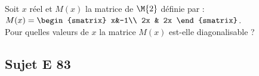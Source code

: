 \documentclass[11pt]{article}
\begin{document}

\begin{exerciceSP}~\\
Soit $x$ réel et $M(x)$ la matrice de $\M{2}$ définie par : 
$M(x)=\begin{smatrix}
x&-1\\ 2x & 2x
\end{smatrix}$.\\
Pour quelles valeurs de $x$ la matrice $M(x)$ est-elle diagonalisable ?
\end{exerciceSP}


\newpage


\subsection*{Sujet E 83}

\end{document}
